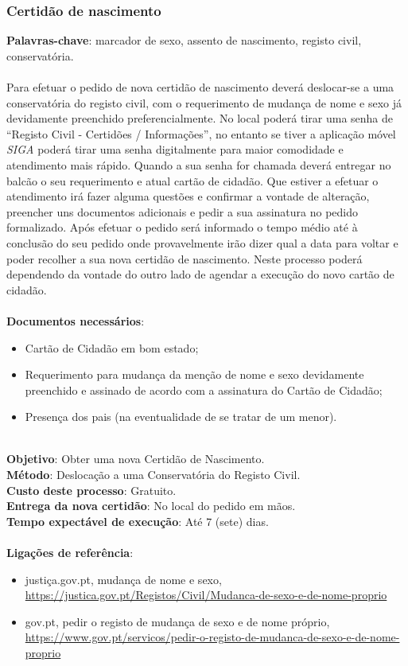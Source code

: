 \subsubsection{Certidão de nascimento}

\textbf{Palavras-chave}: marcador de sexo, assento de nascimento, registo civil, conservatória. \\
\\
Para efetuar o pedido de nova certidão de nascimento deverá deslocar-se
a uma conservatória do registo civil, com o requerimento de mudança de
nome e sexo já devidamente preenchido preferencialmente. No local poderá
tirar uma senha de ``Registo Civil - Certidões / Informações'', no
entanto se tiver a aplicação móvel \emph{SIGA} poderá tirar uma senha
digitalmente para maior comodidade e atendimento mais rápido. Quando a
sua senha for chamada deverá entregar no balcão o seu requerimento e
atual cartão de cidadão. Que estiver a efetuar o atendimento irá fazer
alguma questões e confirmar a vontade de alteração, preencher uns
documentos adicionais e pedir a sua assinatura no pedido formalizado.
Após efetuar o pedido será informado o tempo médio até à conclusão do
seu pedido onde provavelmente irão dizer qual a data para voltar e poder
recolher a sua nova certidão de nascimento. Neste processo poderá
dependendo da vontade do outro lado de agendar a execução do novo cartão
de cidadão. \\
\\
\textbf{Documentos necessários}:
\begin{itemize}
	\item Cartão de Cidadão em bom estado;
	\item Requerimento para mudança da menção de nome e sexo devidamente preenchido e assinado de acordo com a assinatura do Cartão de Cidadão;
	\item Presença dos pais (na eventualidade de se tratar de um menor).
\end{itemize}
\leavevmode\\
\textbf{Objetivo}: Obter uma nova Certidão de Nascimento. \\
\textbf{Método}: Deslocação a uma Conservatória do Registo Civil. \\
\textbf{Custo deste processo}: Gratuito. \\
\textbf{Entrega da nova	certidão}: No local do pedido em mãos. \\
\textbf{Tempo expectável de	execução}: Até 7 (sete) dias. \\
\\
\textbf{Ligações de referência}:
\begin{itemize}
	\item justiça.gov.pt, mudança de nome e sexo, \url{https://justica.gov.pt/Registos/Civil/Mudanca-de-sexo-e-de-nome-proprio}
	\item gov.pt, pedir o registo de mudança de sexo e de nome próprio, \url{https://www.gov.pt/servicos/pedir-o-registo-de-mudanca-de-sexo-e-de-nome-proprio}
\end{itemize}

